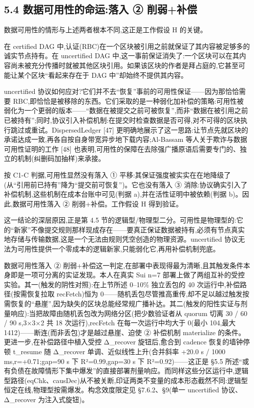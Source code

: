 \documentclass[UTF8,fontset=windows,a4paper,11pt]{ctexart}
\begin{document}
\subsection{5.4 数据可用性的命运:落入 ②
削弱+补偿}\label{ux6570ux636eux53efux7528ux6027ux7684ux547dux8fd0ux843dux5165-ux2461-ux524aux5f31ux8865ux507f}

数据可用性的情形与上述两者根本不同,这正是工作假设 H 的关键。

在 certified DAG
中,认证(RBC)在一个区块被引用之前就保证了其内容被足够多的诚实节点持有。在
uncertified DAG
中,这一事前保证消失了:一个区块可以在其内容尚未被充分传播时就被其他区块引用。如果该区块的作者是拜占庭的,它甚至可能让某个区块``看起来存在于
DAG 中''却始终不提供其内容。

uncertified
协议如何应对?它们并不去``恢复''事前的可用性保证------因为那恰恰需要
RBC,即恰恰是被移除的东西。它们采取的是一种弱化加补偿的策略:可用性被弱化为一个更弱的版本------``数据在被提交之前可被恢复'',而非``数据在被引用之前已被持有'';同时,协议引入补偿机制:在提交时检查数据是否可得,对不可得的区块执行跳过或重试。DispersedLedger
{[}47{]}
更明确地展示了这一思路:让节点先就区块的承诺达成一致,再各自按自身带宽异步地下载内容;Al-Bassam
等人关于欺诈与数据可用性证明的工作 {[}48{]}
也表明,可用性的保障在去除强广播原语后需要专门的、独立的机制(纠删码加抽样)来承接。

按 C1-C 判据,可用性显然没有落入 ①
平移:其保证强度被实实在在地降级了(从``引用前已持有''降为``提交前可恢复'')。它也没有落入
③ 消除:协议确实引入了补偿机制,这些机制在成本台账中可见(判据
a),并在活性证明中被依赖(判据 b)。因此,数据可用性落入 ②
削弱+补偿。工作假设 H 得到验证。

这一结论的深层原因,正是第 4.5
节的逻辑型/物理型二分。可用性是物理型的:它的``新家''不像提交规则那样现成存在------要真正保证数据被持有,必须有节点真实地存储与传输数据,这是一个无法由规则凭空创造的物理资源。uncertified
协议无法为可用性提供一个零成本的逻辑新家,只能弱化它,再用补偿机制兜底。

数据可用性落入 ②
削弱+补偿这一判定,在部署中表现得最为清晰,且其触发条件本身即是一项可分离的实证发现。本人在真实
Sui n=7 部署上做了两组互补的受控实验。其一(触发的阴性对照):在上节所述
0--10\% 独立丢包的 40 次运行中,补偿路径(按需恢复拉取 recFetch)恒为
0------随机丢包尽管推高重传,却不足以越过触发按需恢复的``悬崖'',因为缺失的区块总能经常规广播补达。其二(触发的阳性实证与剂量响应):当把故障由随机丢包改为网络分区(把少数验证者从
quorum 切离 30 / 60 / 90 s,3×3×2 共 18 次运行),recFetch
在每一次运行中均大于 0(最小 104,最大
1412)------断连(而非丢包)才是越过悬崖、迫使 ② 补偿机制 materialize
的条件。更进一步,在补偿路径中植入受控 Δ\_recover 旋钮后,愈合到 cadence
恢复的墙钟停顿 t\_resume 随 Δ\_recover 单调、近似线性上升(合并斜率 +20.0
s / 1000 ms,r=+0.71;gap=90 s 下 R²=0.99,gap=30 s 下 R²=0.92)------这正是
§5.5
所述``或有负债在故障情形下集中爆发''的直接部署剂量响应。而同样这些分区运行中,逻辑型路径(eqChk、causDec)从不被关断,印证两类不变量的成本形态截然不同:逻辑型恒定在线,物理型按需爆发。构念效度限定见
§7.6.2、§9(单一 uncertified 协议、Δ\_recover 为注入式旋钮)。
\end{document}
